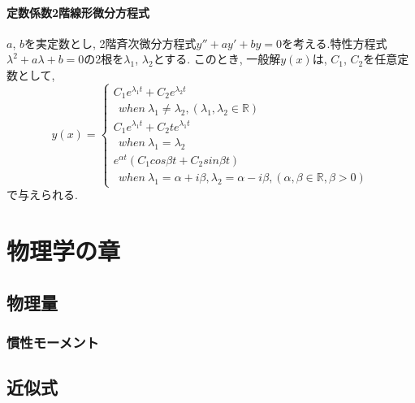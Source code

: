 \documentclass[]{jreport}
\begin{document}
\subsection{定数係数2階線形微分方程式}
$a$, $b$を実定数とし, 2階斉次微分方程式$y''+ay'+by=0$を考える.特性方程式$\lambda^2+a\lambda+b=0$の2根を$\lambda_{1}$, $\lambda_{2}$とする. このとき, 一般解$y(x)$は, $C_{1}$, $C_{2}$を任意定数として, \\
\begin{equation}
    y(x)= \left \{
        \begin{array}{l}
            C_{1}e^{\lambda_{1} t}+C_{2}e^{\lambda_{2} t}\\
            \ \ when \ \lambda_{1}\neq\lambda_{2}, (\lambda_{1}, \lambda_{2}\in\mathbb{R}) \\
            C_{1}e^{\lambda_{1} t}+C_{2}te^{\lambda_{1} t}\\
            \ \ when \ \lambda_{1}=\lambda_{2} \\
            e^{\alpha t}(C_{1}cos{\beta t}+C_{2}sin{\beta t}) \\
            \ \ when \ \lambda_{1}=\alpha+{i\beta}, \lambda_{2}=\alpha-{i\beta}, (\alpha, \beta\in\mathbb{R}, \beta>0)
        \end{array}
    \right.
\end{equation}
で与えられる.

\part{物理学の章}
\chapter{物理量}
\section{慣性モーメント}

\chapter{近似式}
\end{document}
